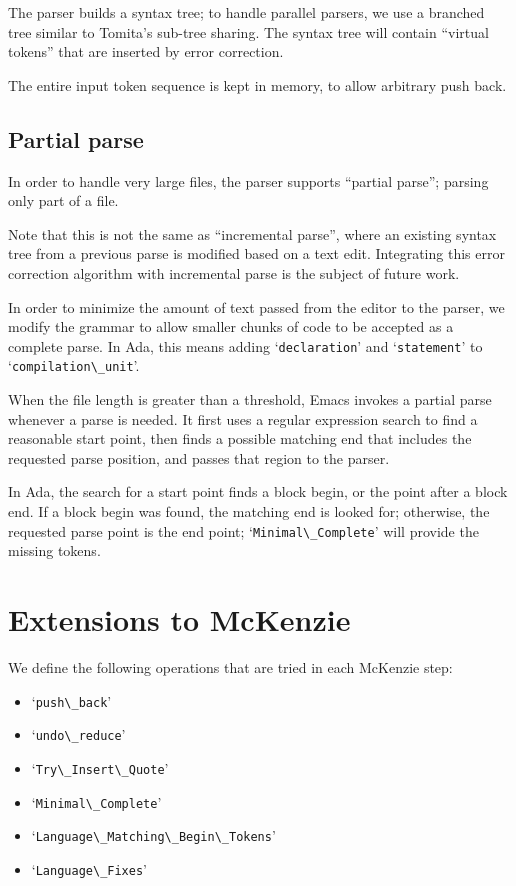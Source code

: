 \documentclass[authordraft]{acmart}
\newcommand{\code}[1]{`\lstinline|#1|'}
\begin{document}
The parser builds a syntax tree; to handle parallel parsers, we use a
branched tree similar to Tomita's sub-tree sharing. The syntax tree
will contain ``virtual tokens'' that are inserted by error correction.

The entire input token sequence is kept in memory, to allow arbitrary
push back.

\subsection{Partial parse}
In order to handle very large files, the parser supports ``partial
parse''; parsing only part of a file.

Note that this is not the same as ``incremental parse'', where an
existing syntax tree from a previous parse is modified based on a text
edit. Integrating this error correction algorithm with incremental
parse is the subject of future work.

In order to minimize the amount of text passed from the editor to the
parser, we modify the grammar to allow smaller chunks of code to be
accepted as a complete parse. In Ada, this means adding
\code{declaration} and \code{statement} to \code{compilation\_unit}.

When the file length is greater than a threshold, Emacs invokes a
partial parse whenever a parse is needed. It first uses a regular
expression search to find a reasonable start point, then finds a
possible matching end that includes the requested parse position, and
passes that region to the parser.

In Ada, the search for a start point finds a block begin, or the point
after a block end. If a block begin was found, the matching end is
looked for; otherwise, the requested parse point is the end point;
\code{Minimal\_Complete} will provide the missing tokens.

\section{Extensions to McKenzie}
We define the following operations that are tried in each McKenzie
step:
\begin{itemize}
\item \code{push\_back}
\item \code{undo\_reduce}
\item \code{Try\_Insert\_Quote}
\item \code{Minimal\_Complete}
\item \code{Language\_Matching\_Begin\_Tokens}
\item \code{Language\_Fixes}
\end{itemize}
\end{document}
